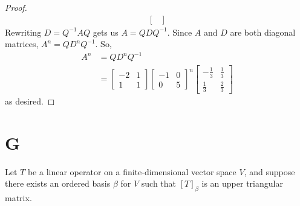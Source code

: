 \documentclass[11pt]{scrartcl}
\begin{document}
\begin{proof}
\begin{align*}
\begin{bmatrix}
		\end{bmatrix}
	\end{align*}
	Rewriting $ D = Q^{-1} A Q $ gets us $ A = QDQ^{-1}$. Since $A$ and $D$ are both diagonal matrices,
	$ A^n = Q D^n Q^{-1}$.
	So,
	\begin{align*}
			A^n & = Q D^n Q^{-1} \\
			& = 
			\begin{bmatrix}
				-2  & 1 \\
				1 & 1
			\end{bmatrix}
			\begin{bmatrix}
				-1&0\\ 0&5
				\end{bmatrix}^n
		\begin{bmatrix}-\frac{1}{3}&\frac{1}{3}\\ \frac{1}{3}&\frac{2}{3}\end{bmatrix}
	\end{align*}
	as desired.
\end{proof}

\section{G}
Let $T$ be a linear operator on a finite-dimensional vector space $V$, and suppose there exists an ordered basis $\beta$ for
$V$ such that $[T]_\beta$ is an upper triangular matrix.




\end{document}
